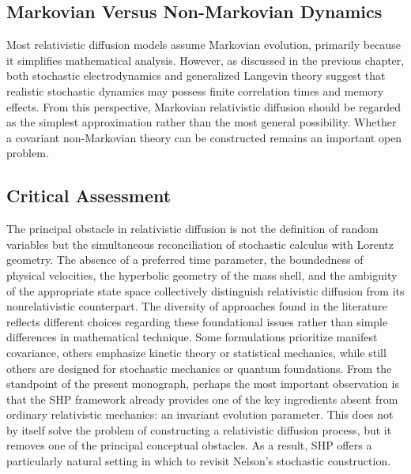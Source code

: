 \subsection{Markovian Versus Non-Markovian Dynamics}
Most relativistic diffusion models assume Markovian evolution,
primarily because it simplifies mathematical analysis.
However,
as discussed in the previous chapter,
both stochastic electrodynamics and generalized Langevin theory suggest
that realistic stochastic dynamics may possess finite correlation times
and memory effects.
From this perspective,
Markovian relativistic diffusion should be regarded as the simplest
approximation rather than the most general possibility.
Whether a covariant non-Markovian theory can be constructed remains an
important open problem.
\subsection*{Critical Assessment}
The principal obstacle in relativistic diffusion is not the definition
of random variables but the simultaneous reconciliation of stochastic
calculus with Lorentz geometry. The absence of a preferred time
parameter, the boundedness of physical velocities, the hyperbolic
geometry of the mass shell, and the ambiguity of the appropriate state
space collectively distinguish relativistic diffusion from its
nonrelativistic counterpart.
The diversity of approaches found in the literature reflects different
choices regarding these foundational issues rather than simple
differences in mathematical technique. Some formulations prioritize
manifest covariance, others emphasize kinetic theory or statistical
mechanics, while still others are designed for stochastic mechanics or
quantum foundations.
From the standpoint of the present monograph, perhaps the most important
observation is that the SHP framework already provides one of the key
ingredients absent from ordinary relativistic mechanics: an invariant
evolution parameter. This does not by itself solve the problem of
constructing a relativistic diffusion process, but it removes one of the
principal conceptual obstacles. As a result, SHP offers a particularly
natural setting in which to revisit Nelson's stochastic construction.
